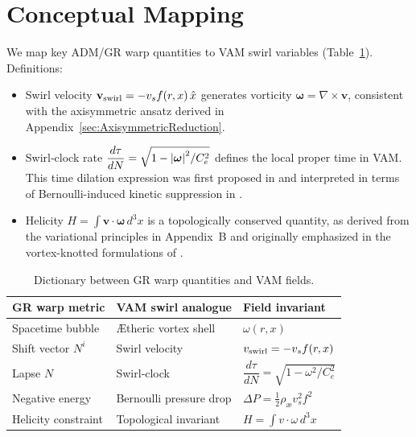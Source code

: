 \documentclass[preprint,notitlepage]{revtex4-2}
\begin{document}
\section{Conceptual Mapping}
We map key ADM/GR warp quantities to VAM swirl variables (Table~\ref{tab:mapping}). Definitions:
\begin{itemize}
  \item Swirl velocity $\mathbf{v}_{\rm swirl} = -v_s f(r,x)\,\hat x$ generates vorticity $\boldsymbol{\omega} = \nabla \times \mathbf{v}$, consistent with the axisymmetric ansatz derived in Appendix~\ref{sec:AxisymmetricReduction}.
  \item Swirl‐clock rate $\dfrac{d\tau}{dN} = \sqrt{1 - \abs{\boldsymbol{\omega}}^2 / C_e^2}$ defines the local proper time in VAM. This time dilation expression was first proposed in \cite{VAM-1} and interpreted in terms of Bernoulli-induced kinetic suppression in \cite{VAM-2}.
  \item Helicity $H = \int \mathbf{v} \cdot \boldsymbol{\omega}\, d^3x$ is a topologically conserved quantity, as derived from the variational principles in Appendix~B and originally emphasized in the vortex-knotted formulations of \cite{VAM-2, VAM-4}.
\end{itemize}

\begin{table}[H]
    \centering
    \renewcommand{\arraystretch}{1.3}
    \begin{tabular}{|l|l|l|}
        \hline
        GR warp metric & VAM swirl analogue & Field invariant \\
        \hline
        Spacetime bubble & Ætheric vortex shell & $\omega(r,x)$ \\
        Shift vector $N^i$ & Swirl velocity & $v_{\rm swirl} = -v_s f(r,x)$ \\
        Lapse $N$ & Swirl‐clock & $\dfrac{d\tau}{dN} = \sqrt{1 - \omega^2 / C_e^2}$ \\
        Negative energy & Bernoulli pressure drop & $\Delta P = \tfrac{1}{2} \rho_{\text{\ae}} v_s^2 f^2$ \\
        Helicity constraint & Topological invariant & $H = \int v \cdot \omega\, d^3x$ \\
        \hline
    \end{tabular}
    \caption{Dictionary between GR warp quantities and VAM fields.}
    \label{tab:mapping}
\end{table}
\end{document}

